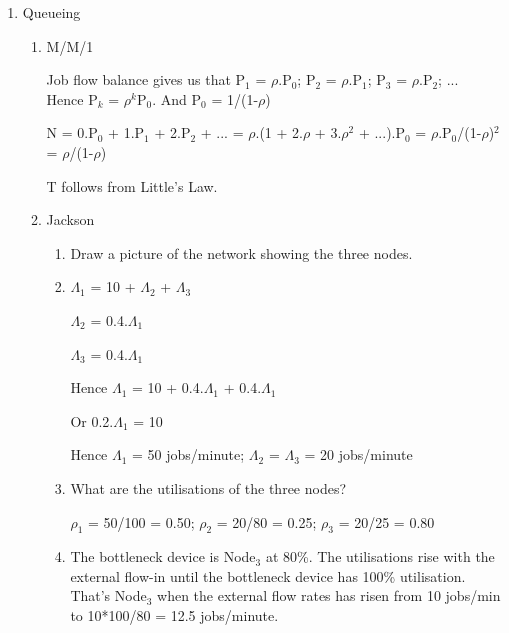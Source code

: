 \begin{enumerate}
\begin{enumerate}
\item What are the utilisations of the three nodes?

\item Which node is the bottleneck in this system?
At what flow rate of external jobs would the system saturate?

\end{enumerate}



\item Queueing

\begin{enumerate}

\item M/M/1

Job flow balance gives us that
P$_1$ = $\rho$.P$_0$;  P$_2$ = $\rho$.P$_1$;  P$_3$ = $\rho$.P$_2$;
...\\
Hence P$_k$ = $\rho^k$P$_0$.
And P$_0$ = 1/(1-$\rho$)


 N = 0.P$_0$ + 1.P$_1$ + 2.P$_2$ + ...
= $\rho$.(1 + 2.$\rho$  + 3.$\rho^2$ + ...).P$_0$
= $\rho$.P$_0$/(1-$\rho$)$^2$
= $\rho$/(1-$\rho$)

T follows from Little's Law.

\item Jackson
\begin{enumerate}
\item Draw a picture of the network showing the three nodes.

\item  $\Lambda_1$ = 10 + $\Lambda_2$ + $\Lambda_3$

$\Lambda_2$ = 0.4.$\Lambda_1$ 

$\Lambda_3$ = 0.4.$\Lambda_1$ 

Hence $\Lambda_1$ = 10 + 0.4.$\Lambda_1$ + 0.4.$\Lambda_1$

Or 0.2.$\Lambda_1$ = 10

Hence $\Lambda_1$ = 50 jobs/minute; 
$\Lambda_2$ =  $\Lambda_3$ = 20 jobs/minute

\item What are the utilisations of the three nodes?

$\rho_1$ = 50/100 = 0.50; $\rho_2$ = 20/80 = 0.25; $\rho_3$ = 20/25 = 0.80

\item The bottleneck device is Node$_3$ at 80\%.
The utilisations rise with the external flow-in until 
the bottleneck device has 100\% utilisation.
That's Node$_3$ when the external flow rates has risen from 10
jobs/min to 10*100/80 = 12.5 jobs/minute.


\end{enumerate}
\end{enumerate}
\end{enumerate}
